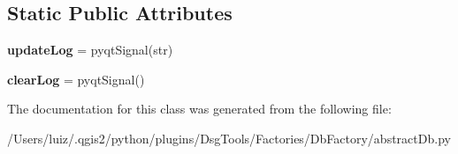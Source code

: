\subsection*{Static Public Attributes}
\begin{DoxyCompactItemize}
\item 
\mbox{\label{class_dsg_tools_1_1_factories_1_1_db_factory_1_1abstract_db_1_1_db_signals_aef8f2df39a64532218fd28ec21743a38}} 
{\bfseries update\+Log} = pyqt\+Signal(str)
\item 
\mbox{\label{class_dsg_tools_1_1_factories_1_1_db_factory_1_1abstract_db_1_1_db_signals_a47e6c89bc196de58dddf7c8940f6c1a1}} 
{\bfseries clear\+Log} = pyqt\+Signal()
\end{DoxyCompactItemize}


The documentation for this class was generated from the following file\+:\begin{DoxyCompactItemize}
\item 
/\+Users/luiz/.\+qgis2/python/plugins/\+Dsg\+Tools/\+Factories/\+Db\+Factory/abstract\+Db.\+py\end{DoxyCompactItemize}
